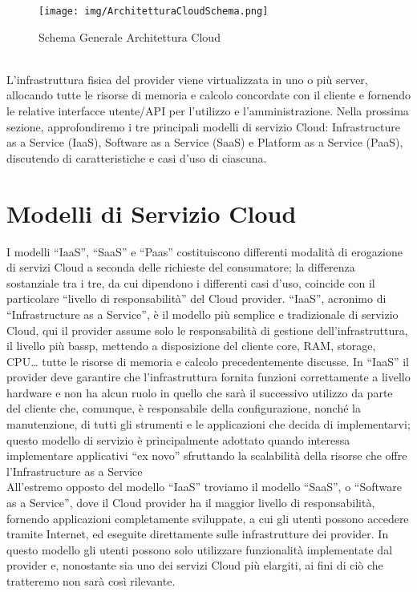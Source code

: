 \documentclass[a4paper,12pt]{report}
\begin{document}
\begin{figure}[h]
    \centering
    \texttt{[image: img/ArchitetturaCloudSchema.png]}
    \caption{Schema Generale Architettura Cloud}
\end{figure}
\\[0ex]
L'infrastruttura fisica del provider viene virtualizzata in uno o più server, allocando tutte le risorse di memoria e calcolo concordate con il cliente e fornendo le relative interfacce utente/API per l’utilizzo e l’amministrazione. Nella prossima sezione, approfondiremo i tre principali modelli di servizio Cloud: Infrastructure as a Service (IaaS), Software as a Service (SaaS) e Platform as a Service (PaaS), discutendo di caratteristiche e casi d’uso di ciascuna.
\section{Modelli di Servizio Cloud}
I modelli “IaaS”, “SaaS” e “Paas” costituiscono differenti modalità di erogazione di servizi Cloud a seconda delle richieste del consumatore; la differenza sostanziale tra i tre, da cui dipendono i differenti casi d’uso, coincide con il particolare “livello di responsabilità” del Cloud provider. “IaaS”, acronimo di “Infrastructure as a Service”, è il modello più semplice e tradizionale di servizio Cloud, qui il provider assume solo le responsabilità di gestione dell’infrastruttura, il livello più bassp, mettendo a disposizione del cliente core, RAM, storage, CPU… tutte le risorse di memoria e calcolo precedentemente discusse. In “IaaS” il provider deve garantire che l’infrastruttura fornita funzioni correttamente a livello hardware e non ha alcun ruolo in quello che sarà il successivo utilizzo da parte del cliente che, comunque, è responsabile della configurazione, nonché la manutenzione, di tutti gli strumenti e le applicazioni che decida di implementarvi; questo modello di servizio è principalmente adottato quando interessa implementare applicativi “ex novo” sfruttando la scalabilità della risorse che offre l’Infrastructure as a Service
\\[0ex]
All'estremo opposto del modello “IaaS” troviamo il modello “SaaS”, o “Software as a Service”, dove il Cloud provider ha il maggior livello di responsabilità, fornendo applicazioni completamente sviluppate, a cui gli utenti possono accedere tramite Internet, ed eseguite direttamente sulle infrastrutture dei provider. In questo modello gli utenti possono solo utilizzare funzionalità implementate dal provider e, nonostante sia uno dei servizi Cloud più elargiti, ai fini di ciò che tratteremo non sarà così rilevante.
\end{document}
